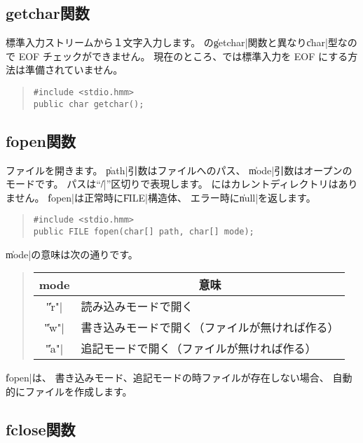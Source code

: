 \subsection{getchar関数}

標準入力ストリームから１文字入力します。
\cl の\|getchar|関数と異なり\|char|型なので EOF チェックができません。
現在のところ、\tacos では標準入力を EOF にする方法は準備されていません。

\begin{quote}
\begin{verbatim}
#include <stdio.hmm>
public char getchar();
\end{verbatim}
\end{quote}

\subsection{fopen関数}

ファイルを開きます。
\|path|引数はファイルへのパス、
\|mode|引数はオープンのモードです。
パスは``\|/|''区切りで表現します。
\tacos にはカレントディレクトリはありません。
\|fopen|は正常時に\|FILE|構造体、
エラー時に\|null|を返します。

\begin{quote}
\begin{verbatim}
#include <stdio.hmm>
public FILE fopen(char[] path, char[] mode);
\end{verbatim}
\end{quote}

\|mode|の意味は次の通りです。

\begin{quote}
\begin{tabular}{c|l}
\multicolumn{1}{c|}{mode} & \multicolumn{1}{c}{意味} \\\hline
\|"r"| & 読み込みモードで開く \\
\|"w"| & 書き込みモードで開く（ファイルが無ければ作る） \\
\|"a"| & 追記モードで開く（ファイルが無ければ作る）
\end{tabular}
\end{quote}

\|fopen|は、
書き込みモード、追記モードの時ファイルが存在しない場合、
自動的にファイルを作成します。

\subsection{fclose関数}

